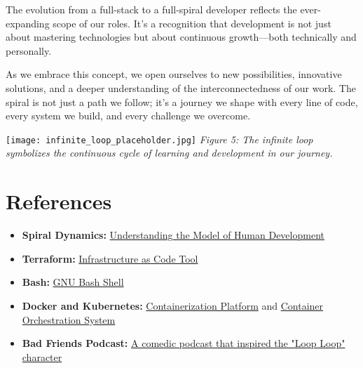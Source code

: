 \documentclass{article}
\begin{document}
The evolution from a full-stack to a full-spiral developer reflects the ever-expanding scope of our roles. It's a recognition that development is not just about mastering technologies but about continuous growth—both technically and personally.

As we embrace this concept, we open ourselves to new possibilities, innovative solutions, and a deeper understanding of the interconnectedness of our work. The spiral is not just a path we follow; it's a journey we shape with every line of code, every system we build, and every challenge we overcome.

\vspace{0.5cm}
\noindent\texttt{[image: infinite\_loop\_placeholder.jpg]}
\newline
\textit{Figure 5: The infinite loop symbolizes the continuous cycle of learning and development in our journey.}
\vspace{0.5cm}

\section*{References}

\begin{itemize}
    \item \textbf{Spiral Dynamics:} \href{https://en.wikipedia.org/wiki/Spiral_Dynamics}{Understanding the Model of Human Development}
    \item \textbf{Terraform:} \href{https://www.hashicorp.com/products/terraform}{Infrastructure as Code Tool}
    \item \textbf{Bash:} \href{https://www.gnu.org/software/bash/}{GNU Bash Shell}
    \item \textbf{Docker and Kubernetes:} \href{https://www.docker.com/}{Containerization Platform} and \href{https://kubernetes.io/}{Container Orchestration System}
    \item \textbf{Bad Friends Podcast:} \href{https://www.youtube.com/channel/UC3e8IMJ8R5fp8xCXmciZQpQ}{A comedic podcast that inspired the "Loop Loop" character}
\end{itemize}
\end{document}
